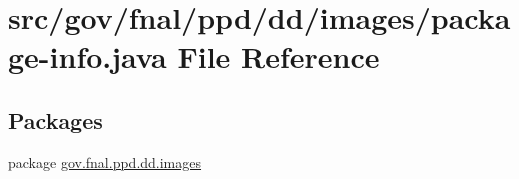 \hypertarget{gov_2fnal_2ppd_2dd_2images_2package-info_8java}{\section{src/gov/fnal/ppd/dd/images/package-\/info.java File Reference}
\label{gov_2fnal_2ppd_2dd_2images_2package-info_8java}
}
\subsection*{Packages}
\begin{DoxyCompactItemize}
\item 
package \hyperlink{namespacegov_1_1fnal_1_1ppd_1_1dd_1_1images}{gov.\-fnal.\-ppd.\-dd.\-images}
\end{DoxyCompactItemize}
